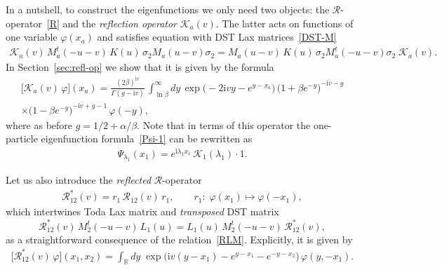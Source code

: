 \documentclass[11pt]{article}
\numberwithin{equation}{section}
\theoremstyle{plain}
\theoremstyle{definition}
\renewcommand{\phi}{\varphi}
\renewcommand{\imath}{\mathrm{i}}
\begin{document}
In a nutshell, to construct the eigenfunctions we only need two objects: the $\mathcal{R}$-operator~\eqref{R} and the \textit{reflection operator} $\mathcal{K}_a(v)$. The latter acts on functions of one variable $\phi(x_a)$ and satisfies equation with DST Lax matrices~\eqref{DST-M}
\begin{align}\label{KMKM-0}
	\mathcal{K}_a(v) \, M_a^t(-u-v) \, K(u) \, \sigma_2 M_a(u - v) \sigma_2
	= M_a(u - v) \, K(u) \, \sigma_2 M_a^t(-u -v) \sigma_2 \; \mathcal{K}_a(v).
\end{align}
In Section~\ref{sec:refl-op} we show that it is given by the formula 
\begin{multline}\label{K-0}
	\bigl[ \mathcal{K}_a (v) \, \phi \bigr](x_a) = \frac{(2\beta)^{\imath v}}{\Gamma ( g- \imath v )} \, \int_{\ln \beta}^{\infty} dy \, \exp \bigl(-2 \imath v y - e^{y -x_a} \bigr) \, \bigl(1 + \beta e^{-y}\bigr)^{- \imath v - g } \\
	\times \bigl(1 - \beta e^{-y}\bigr)^{- \imath v + g - 1} \, \phi( - y),
\end{multline}
where as before $g = 1/2 + \alpha/\beta$. Note that in terms of this operator the one-particle eigenfunction formula~\eqref{Psi-1} can be rewritten as
\begin{align}
	\Psi_{\lambda_1}(x_1) = e^{\imath \lambda_1 x_1} \, \mathcal{K}_1(\lambda_1) \cdot 1.
\end{align}

Let us also introduce the \textit{reflected} $\mathcal{R}$-operator
\begin{align}\label{Rr}
	\mathcal{R}^*_{12}(v) = r_1 \, \mathcal{R}_{12}(v) \, r_1, \qquad r_1 \colon \; \phi(x_1) \mapsto \phi(-x_1),
\end{align}
which intertwines Toda Lax matrix and \textit{transposed} DST matrix
\begin{equation}\label{RMtL}
	\mathcal{R}^*_{12}(v) \, M^t_2(-u-v) \, L_1(u) = L_1(u ) \, M^t_2(-u-v) \, \mathcal{R}^*_{12}(v),
\end{equation}
as a straightforward consequence of the relation~\eqref{RLM}.
Explicitly, it is given by 
\begin{align} \label{Rr-expl}
	\bigl[ \mathcal{R}^*_{12} (v)\, \phi \bigr](x_1, x_2) = \int_{\mathbb{R}} dy \; \exp \bigl( \imath v(y - x_1) - e^{y - x_1} - e^{-y - x_2} \bigr)\, \phi(y, -x_1).
\end{align}
\end{document}
